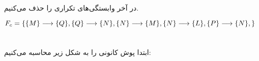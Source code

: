 \documentclass{article}
\begin{document}
در آخر وابستگی‌های تکراری را حذف می‌کنیم.
\begin{latin}
$
\\F_{c}=\\
\{\\
	\{M\}\longrightarrow\{Q\},\\
	\{Q\}\longrightarrow\{N\},\\
	\{N\}\longrightarrow\{M\},\\
	\{N\}\longrightarrow\{L\},\\
	\{P\}\longrightarrow\{N\},\\
\}
$
\end{latin}


\section{}%
ابتدا پوش کانونی را به شکل زیر محاسبه می‌کنیم:
\end{document}

